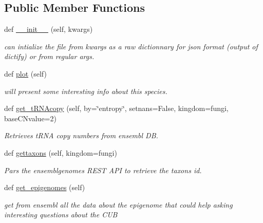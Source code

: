 \subsection*{Public Member Functions}
\begin{DoxyCompactItemize}
\item 
\mbox{\label{class_py_c_u_b_1_1espece_1_1_espece_a13a7403216d2c03d6e9ec81d6034196e}} 
def \mbox{\hyperlink{class_py_c_u_b_1_1espece_1_1_espece_a13a7403216d2c03d6e9ec81d6034196e}{\+\_\+\+\_\+init\+\_\+\+\_\+}} (self, kwargs)
\begin{DoxyCompactList}\small\item\em can intialize the file from kwargs as a raw dictionnary for json format (output of dictify) or from regular args. \end{DoxyCompactList}\item 
\mbox{\label{class_py_c_u_b_1_1espece_1_1_espece_ab33e33544d897c99c08074e90ca0105f}} 
def \mbox{\hyperlink{class_py_c_u_b_1_1espece_1_1_espece_ab33e33544d897c99c08074e90ca0105f}{plot}} (self)
\begin{DoxyCompactList}\small\item\em will present some interesting info about this species. \end{DoxyCompactList}\item 
def \mbox{\hyperlink{class_py_c_u_b_1_1espece_1_1_espece_afa35655bb969cbc02456aa74228a1b8d}{get\+\_\+t\+R\+N\+Acopy}} (self, by=\char`\"{}entropy\char`\"{}, setnans=False, kingdom=\textquotesingle{}fungi\textquotesingle{}, base\+C\+Nvalue=2)
\begin{DoxyCompactList}\small\item\em Retrieves t\+R\+NA copy numbers from ensembl DB. \end{DoxyCompactList}\item 
def \mbox{\hyperlink{class_py_c_u_b_1_1espece_1_1_espece_af716fcd7e7e34e12cd7786469d695422}{gettaxons}} (self, kingdom=\textquotesingle{}fungi\textquotesingle{})
\begin{DoxyCompactList}\small\item\em Pars the ensemblgenomes R\+E\+ST A\+PI to retrieve the taxons id. \end{DoxyCompactList}\item 
\mbox{\label{class_py_c_u_b_1_1espece_1_1_espece_aed93f9be40c4521c6aed536125268432}} 
def \mbox{\hyperlink{class_py_c_u_b_1_1espece_1_1_espece_aed93f9be40c4521c6aed536125268432}{get\+\_\+epigenomes}} (self)
\begin{DoxyCompactList}\small\item\em get from ensembl all the data about the epigenome that could help asking interesting questions about the C\+UB \end{DoxyCompactList}\end{DoxyCompactItemize}
